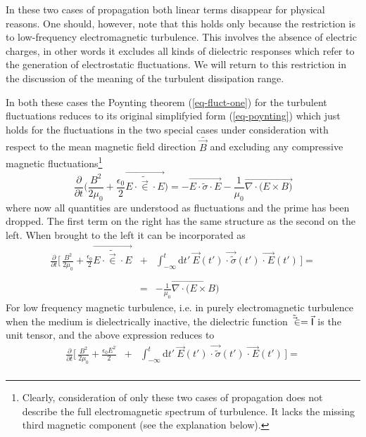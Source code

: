 \documentclass[ ]{copernicus2}
\begin{document}
{{In these two cases of propagation both linear terms disappear for physical reasons. One should, however, note that this holds only because the restriction is to low-frequency electromagnetic turbulence. This involves the absence of electric charges, in other words it excludes all kinds of dielectric responses which refer to the generation of electrostatic fluctuations. We will return to this restriction in the discussion of the meaning of the turbulent dissipation range.} 

In both {these cases the Poynting theorem} (\ref{eq-fluct-one}) for the turbulent fluctuations reduces to its original simplifyied form (\ref{eq-poynting}) which just holds for the fluctuations in the two special cases under consideration with respect to the mean magnetic field direction $\bar{\vec{B}}$ and excluding any compressive magnetic fluctuations\footnote{Clearly, consideration of only these two cases of propagation does not describe the full electromagnetic spectrum of turbulence. It lacks the missing third magnetic component (see the explanation below).}
\begin{equation}\label{eq-fluct-two}
\frac{\partial}{\partial t}\Big(\frac{B^2}{2\mu_0}+\frac{\epsilon_0}{2}\vec{E\cdot\tilde{\vec{\in}}\cdot E}\Big)=-\vec{E\cdot\tilde{\sigma}\cdot E}-\frac{1}{\mu_0}\vec{\nabla\cdot\Big(E\times B\Big)}
\end{equation}
where now all quantities are understood as fluctuations and the prime has been dropped. The first term on the right has the same structure as the second on the left. When brought to the left it can be incorporated as
\begin{eqnarray}
\frac{\partial}{\partial t}\bigg[\,\frac{B^2}{2\mu_0}+\frac{\epsilon_0}{2}\vec{E\cdot\tilde{\vec{\in}}\cdot E} &+&\!\!\!\!\int_{-\infty}^t\!\!\!\!\!\!\!\!\mathrm{d}t'\ \vec{E}(t')\ \vec{\cdot\ \tilde{\sigma}}(t')\ \vec{\cdot\ E}(t')\, \bigg] =\nonumber \\[-1.5ex]
&&\\[-1.5ex]
&=&-\frac{1}{\mu_0}\vec{\nabla\cdot\Big(E\times B\Big)}\nonumber
\end{eqnarray}
For low frequency magnetic turbulence, i.e. in purely electromagnetic turbulence when the medium is dielectrically inactive, the dielectric function $\tilde{\vec{\in}}=\vec{\sf I}$ is the unit tensor, and the above expression reduces to 
\begin{eqnarray}
\frac{\partial}{\partial t}\bigg[\,\frac{B^2}{2\mu_0}+\frac{\epsilon_0E^2}{2} &+&\!\!\!\!\int_{-\infty}^t\!\!\!\!\!\!\!\!\mathrm{d}t'\ \vec{E}(t')\ \vec{\cdot\ \tilde{\sigma}}(t')\ \vec{\cdot\ E}(t')\, \bigg]=\nonumber \\[-1.5ex]

\end{eqnarray}}
\end{document}
